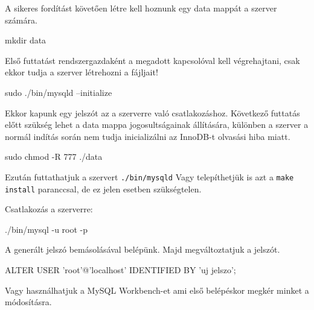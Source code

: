 A sikeres fordítást követően létre kell hoznunk egy data mappát a szerver számára.
\begin{python}
 mkdir data
\end{python}
Első futtatást rendszergazdaként a megadott kapcsolóval kell végrehajtani, csak ekkor tudja a szerver létrehozni a fájljait!
\begin{python}
 sudo ./bin/mysqld --initialize
\end{python}
Ekkor kapunk egy jelszót az a szerverre való csatlakozáshoz. Következő futtatás előtt szükség lehet a data mappa jogosultságainak állítására, különben a szerver a normál indítás során nem tudja inicializálni az InnoDB-t olvasási hiba miatt.
\begin{python}
 sudo chmod -R 777 ./data
\end{python}
Ezután futtathatjuk a szervert
\texttt{./bin/mysqld}
Vagy telepíthetjük is azt a \texttt{make install} paranccsal, de ez jelen esetben szükségtelen.



Csatlakozás a szerverre:
\begin{python}
 ./bin/mysql -u root -p
\end{python}
A generált jelszó bemásolásával belépünk. Majd megváltoztatjuk a jelszót.
\begin{python}
ALTER USER 'root'@'localhost' IDENTIFIED BY 'uj jelszo';
\end{python}
Vagy használhatjuk a MySQL Workbench-et ami első belépéskor megkér minket a módosításra.
